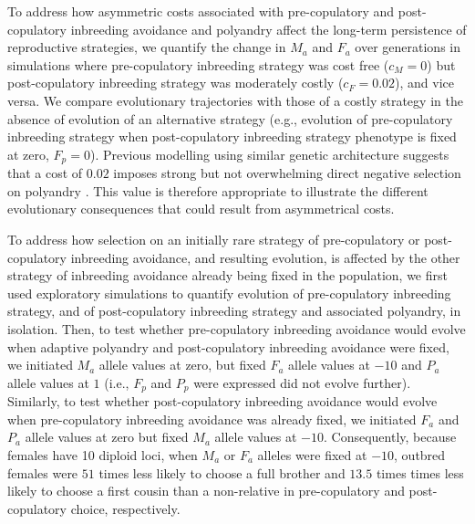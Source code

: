 \documentclass[10pt,letterpaper]{article}
\begin{document}
To address how asymmetric costs associated with pre-copulatory and post-copulatory inbreeding avoidance and polyandry affect the long-term persistence of reproductive strategies, we quantify the change in $M_{a}$ and $F_{a}$ over generations in simulations where pre-copulatory inbreeding strategy was cost free ($c_{M}=0$) but post-copulatory inbreeding strategy was moderately costly ($c_{F}=0.02$), and vice versa. We compare evolutionary trajectories with those of a costly strategy in the absence of evolution of an alternative strategy (e.g., evolution of pre-copulatory inbreeding strategy when post-copulatory inbreeding strategy phenotype is fixed at zero, $F_{p}=0$). Previous modelling using similar genetic architecture suggests that a cost of $0.02$ imposes strong but not overwhelming direct negative selection on polyandry \cite[][]{Duthie}. This value is therefore appropriate to illustrate the different evolutionary consequences that could result from asymmetrical costs.

To address how selection on an initially rare strategy of pre-copulatory or post-copulatory inbreeding avoidance, and resulting evolution, is affected by the other strategy of inbreeding avoidance already being fixed in the population, we first used exploratory simulations to quantify evolution of pre-copulatory inbreeding strategy, and of post-copulatory inbreeding strategy and associated polyandry, in isolation. Then, to test whether pre-copulatory inbreeding avoidance would evolve when adaptive polyandry and post-copulatory inbreeding avoidance were fixed, we initiated $M_{a}$ allele values at zero, but fixed $F_{a}$ allele values at $-10$ and $P_{a}$ allele values at $1$ (i.e., $F_{p}$ and $P_{p}$ were expressed did not evolve further). Similarly, to test whether post-copulatory inbreeding avoidance would evolve when pre-copulatory inbreeding avoidance was already fixed, we initiated $F_{a}$ and $P_{a}$ allele values at zero but fixed $M_{a}$ allele values at $-10$. Consequently, because females have 10 diploid loci, when $M_{a}$ or $F_{a}$ alleles were fixed at $-10$, outbred females were $51$ times less likely to choose a full brother and $13.5$ times times less likely to choose a first cousin than a non-relative in pre-copulatory and post-copulatory choice, respectively.
\end{document}
